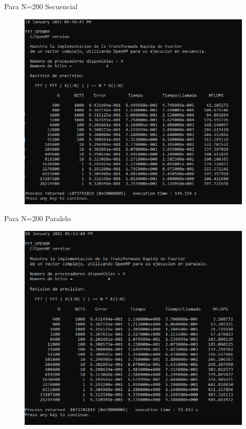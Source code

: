 \documentclass{report}
\begin{document}
\clearpage
Para N=200 Secuencial

\begin{figure}[h!]
    \centering
    \includegraphics[scale=.8]{Images/FFT_Sec_200.png}
    \label{Secuencial 1.5}
\end{figure}

\clearpage
Para N=200 Paralelo\medskip

\begin{figure}[h!]
    \centering
    \includegraphics[scale=.8]{Images/FFT_Par_200.png}
    \label{Paralelo 1.5}
\end{figure}
\end{document}
